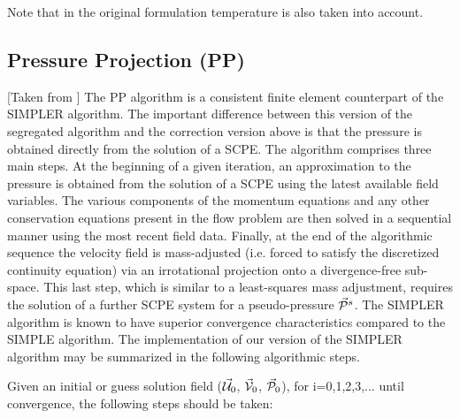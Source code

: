 \documentclass[a4paper,12pt]{article}
\begin{document}
Note that in the original formulation temperature is also taken into account.

\subsection{Pressure Projection (PP)}

[Taken from \cite{haeh93}] 
The PP algorithm is a consistent finite element
counterpart of the SIMPLER algorithm. The important difference between this
version of the segregated algorithm and the correction version above 
is that the pressure is obtained directly from the solution of a SCPE. 
The algorithm comprises three main steps. At the
beginning of a given iteration, an approximation to the pressure is 
obtained from the solution of a SCPE using the latest available field 
variables. The various components of the momentum
equations and any other conservation equations present in the 
flow problem are then solved in
a sequential manner using the most recent field data. Finally, at 
the end of the algorithmic sequence the velocity field is mass-adjusted 
(i.e. forced to satisfy the discretized continuity
equation) via an irrotational projection onto a divergence-free sub-space. 
This last step, which is similar to a least-squares mass adjustment, 
requires the solution of a further SCPE system for
a pseudo-pressure $\vec{\cal P}^s$. The SIMPLER algorithm is known to have superior 
convergence characteristics compared to the SIMPLE algorithm.
The implementation of our version of the SIMPLER algorithm may be summarized in the
following algorithmic steps.

Given an initial or guess solution field 
($\vec{\cal U}_0$, $\vec{\cal V}_0$, $\vec{\cal P}_0$), 
for i=0,1,2,3,... until convergence, the following steps should be taken:
\end{document}
